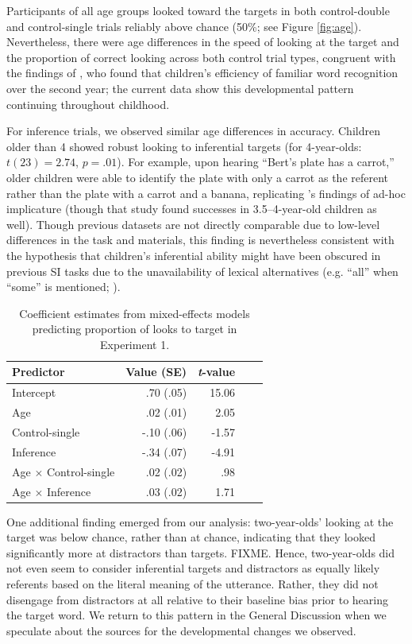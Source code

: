 \documentclass[10pt,letterpaper]{article}
\begin{document}
Participants of all age groups looked toward the targets in both control-double and control-single trials reliably above chance (50\%; see Figure \ref{fig:age}). Nevertheless, there were age differences in the speed of looking at the target and the proportion of correct looking across both control trial types, congruent with the findings of , who found that children's efficiency of familiar word recognition over the second year; the current data show this developmental pattern continuing throughout childhood. 

For inference trials, we observed similar age differences in accuracy. Children older than 4 showed robust looking to inferential targets (for 4-year-olds: $t(23) = 2.74$, $p =.01$). For example, upon hearing ``Bert's plate has a carrot,'' older children were able to identify the plate with only a carrot as the referent rather than the plate with a carrot and a banana, replicating 's findings of ad-hoc implicature (though that study found successes in 3.5--4-year-old children as well). Though previous datasets are not directly comparable due to low-level differences in the task and materials, this finding is nevertheless consistent with the hypothesis that children's inferential ability might have been obscured in previous SI tasks due to the unavailability of lexical alternatives (e.g. ``all'' when ``some'' is mentioned; ).


\begin{table}[b!]
\caption{\label{tab:lmer1}  Coefficient estimates from mixed-effects models predicting proportion of looks to target in Experiment 1.} 
\begin{center} 
\begin{tabular}{l r r r l} 
\hline
Predictor  &  Value (SE) & \emph{t}-value\\
\hline
Intercept  & .70 (.05) & 15.06 \\
Age & .02 (.01) &  2.05 \\
Control-single & -.10 (.06) & -1.57 \\
Inference & -.34 (.07) & -4.91 \\
Age $\times$ Control-single & .02 (.02) & .98 \\
Age $\times$ Inference & .03 (.02) & 1.71 \\
\hline
\end{tabular} 
\end{center} 
\end{table}

One additional finding emerged from our analysis: two-year-olds' looking at the target was below chance, rather than at chance, indicating that they looked significantly more at distractors than targets. FIXME. Hence, two-year-olds did not even seem to consider inferential targets and distractors as equally likely referents based on the literal meaning of the utterance. Rather, they did not disengage from distractors at all relative to their baseline bias prior to hearing the target word. We return to this pattern in the General Discussion when we speculate about the sources for the developmental changes we observed. 
\end{document}
